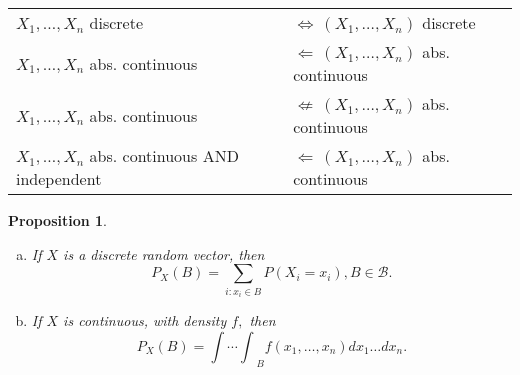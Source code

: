 \documentclass[12pt]{report} \addtolength{\textheight}{2in}
\newtheorem{prop}{Proposition}
\newcommand{\Borel}{\mathscr{B}}
\newcommand{\totalint}{\int_{-\infty}^{\infty}}
\newcommand{\Realnum}{\mathbb{R}}
\begin{document}
\begin{tabularx}{\textwidth}{ XX }

$X_1,\dots, X_n$ discrete & $\iff     \hspace{2pt }(X_1,\dots,X_n)$ discrete  \\
$X_1,\dots, X_n$ abs. continuous & $\Leftarrow     \hspace{2pt } (X_1,\dots,X_n)$ abs. continuous  \\
$X_1,\dots, X_n$ abs. continuous & $\not\Leftarrow  \hspace{2pt } (X_1,\dots,X_n)$ abs. continuous  \\
$X_1,\dots, X_n$ abs. continuous
 AND independent  &$ \Leftarrow   \hspace{2pt }  (X_1,\dots,X_n)$ abs. continuous  \\
\end{tabularx}
\begin{prop}
\begin{enumerate}[(a)]
\item If $X$ is a discrete random vector, then
\begin{displaymath}
P_X{(B)}=\sum_{i: x_i \in B} P(X_i =x_i), B \in \Borel.
\end{displaymath}
\item If $X$ is continuous, with density $f,$ then
\begin{displaymath}
P_X{(B)} ={ \int \cdots \int }_{B} f(x_1,\dots,x_n) dx_1\dots dx_n.
\end{displaymath}
\end{enumerate}
\end{prop}
\end{document}
